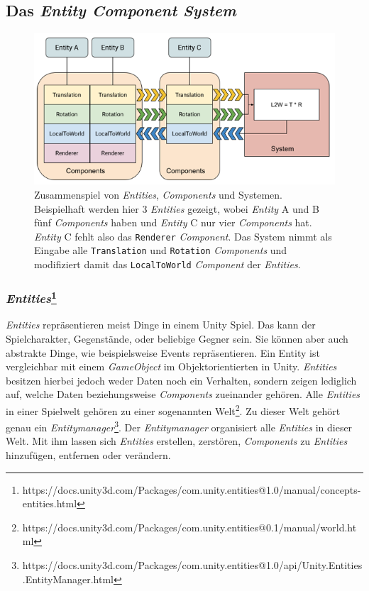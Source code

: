\documentclass[12pt, titlepage]{article}
\DeclareRobustCommand{\#}{\adjustbox{valign=B,totalheight=.57\baselineskip}{\oldhash}}%
\begin{document}
\subsection{Das \textit{Entity Component System}} \label{ecs}
\begin{figure}[H]
\begin{center}
\includegraphics[scale=0.8]{Bilder/ECSConcept.png}
\caption{Zusammenspiel von \textit{Entities}, \textit{Components} und Systemen. Beispielhaft werden hier 3 \textit{Entities} gezeigt, wobei \textit{Entity} A und B fünf \textit{Components} haben und \textit{Entity} C nur vier \textit{Components} hat. \textit{Entity} C fehlt also das \texttt{Renderer} \textit{Component}. Das System nimmt als Eingabe alle \texttt{Translation} und \texttt{Rotation} \textit{Components} und modifiziert damit das \texttt{LocalToWorld} \textit{Component} der \textit{Entities}.}
\label{fig:ecs_concept}
\end{center}
\end{figure}
\subsubsection{\textit{Entities}\footnote{https://docs.unity3d.com/Packages/com.unity.entities@1.0/manual/concepts-entities.html}}\textit{Entities} repräsentieren meist Dinge in einem Unity Spiel. Das kann der Spielcharakter, Gegenstände, oder beliebige Gegner sein. Sie können aber auch abstrakte Dinge, wie beispielsweise Events repräsentieren. Ein Entity ist vergleichbar mit einem \textit{GameObject} im Objektorientierten in Unity. \textit{Entities} besitzen hierbei jedoch weder Daten noch ein Verhalten, sondern zeigen lediglich auf, welche Daten beziehungsweise \textit{Components} zueinander gehören. Alle \textit{Entities} in einer Spielwelt gehören zu einer sogenannten Welt\footnote{https://docs.unity3d.com/Packages/com.unity.entities@0.1/manual/world.html}. Zu dieser Welt gehört genau ein \textit{Entitymanager}\footnote{https://docs.unity3d.com/Packages/com.unity.entities@1.0/api/Unity.Entities.EntityManager.html}. Der \textit{Entitymanager} organisiert alle \textit{Entities} in dieser Welt. Mit ihm lassen sich \textit{Entities} erstellen, zerstören, \textit{Components} zu \textit{Entities} hinzufügen, entfernen oder verändern.
\end{document}
